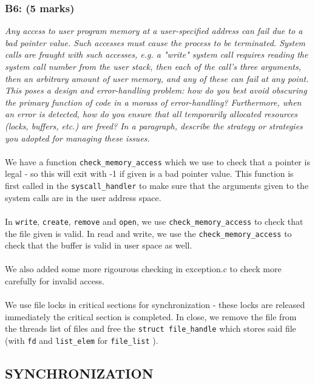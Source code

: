 \documentclass{article}
\begin{document}
\subsubsection*{B6: (5 marks) }
\textit{Any access to user program memory at a user-specified address can fail due to
a bad pointer value. Such accesses must cause the process to be terminated.
System calls are fraught with such accesses, e.g. a "write" system call
requires reading the system call number from the user stack, then each of the
call's three arguments, then an arbitrary amount of user memory, and any of
these can fail at any point. This poses a design and error-handling problem:
how do you best avoid obscuring the primary function of code in a morass of
error-handling? Furthermore, when an error is detected, how do you ensure
that all temporarily allocated resources (locks, buffers, etc.) are freed?
In a paragraph, describe the strategy or strategies you adopted for managing
these issues.}
\\ \\
We have a function \texttt{check\_memory\_access} which we use to check that a pointer is
legal - so this will exit with -1 if given is a bad pointer value.
This function is first called in the \texttt{syscall\_handler} to make sure that the
arguments given to the system calls are in the user address space.
\\ \\
In \texttt{write}, \texttt{create}, \texttt{remove} and \texttt{open}, we use \texttt{check\_memory\_access}
to check that the file given is valid. In read and write, we use the \texttt{check\_memory\_access}
to check that the buffer is valid in user space as well.
\\ \\
We also added some more rigourous checking in exception.c to check more carefully
for invalid access.
\\ \\
We use file locks in critical sections for synchronization - these locks
are released immediately the critical section is completed. In close, we remove
the file from the threads list of files and free the  \texttt{struct file\_handle} which stores
said file (with \texttt{fd} and \texttt{list\_elem} for \texttt{file\_list} ).

\subsection{SYNCHRONIZATION}
\end{document}
